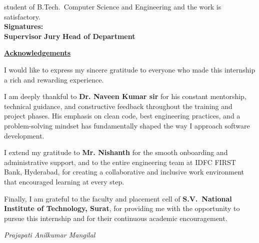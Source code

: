 \vspace{0.4cm}
student of B.Tech.\ Computer Science and Engineering and the work is
satisfactory. \\[2.5cm]

\textbf{Signatures:} \\[2cm]
\textbf{Supervisor} \hfill \textbf{Jury} \hfill \textbf{Head of Department}
\newpage
\begin{center}
  \textbf{\Huge \underline{Acknowledgements}} \\[1.5cm]
\end{center}

I would like to express my sincere gratitude to everyone who made this
internship a rich and rewarding experience.

I am deeply thankful to \textbf{Dr. Naveen Kumar sir} for his constant mentorship,
technical guidance, and constructive feedback throughout the training and project
phases. His emphasis on clean code, best engineering practices, and a
problem-solving mindset has fundamentally shaped the way I approach software
development.

I extend my gratitude to \textbf{Mr. Nishanth} for the smooth
onboarding and administrative support, and to the entire engineering team at
IDFC FIRST Bank, Hyderabad, for creating a collaborative and inclusive work
environment that encouraged learning at every step.

Finally, I am grateful to the faculty and placement cell of \textbf{S.V.\
National Institute of Technology, Surat}, for providing me with the opportunity
to pursue this internship and for their continuous academic encouragement.

\vspace{1cm}
\textit{Prajapati Anilkumar Mangilal}